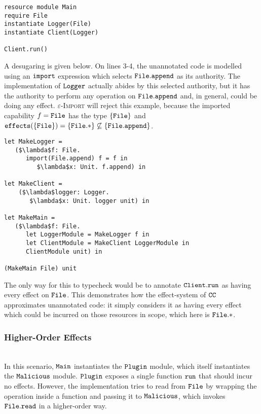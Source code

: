 \begin{lstlisting}
resource module Main
require File
instantiate Logger(File)
instantiate Client(Logger)

Client.run()
\end{lstlisting}

A desugaring is given below. On lines 3-4, the unannotated code is modelled using an $\mathtt{import}$ expression which selects $\mathtt{File.append}$ as its authority. The implementation of $\mathtt{Logger}$ actually abides by this selected authority, but it has the authority to perform any operation on $\mathtt{File.append}$ and, in general, could be doing any effect. \textsc{$\varepsilon$-Import} will reject this example, because the imported capability $f = \mathtt{File}$ has the type $\{ \mathtt{File} \}$ and $\mathtt{effects}(\{ \mathtt{File} \}) = \{ \mathtt{File}.* \} \not\subseteq \{ \mathtt{ File.append } \}$.

\begin{lstlisting}
let MakeLogger =
   ($\lambda$f: File.
      import(File.append) f = f in
         $\lambda$x: Unit. f.append) in

let MakeClient =
	($\lambda$logger: Logger.
	   $\lambda$x: Unit. logger unit) in

let MakeMain =
   ($\lambda$f: File.
      let LoggerModule = MakeLogger f in
      let ClientModule = MakeClient LoggerModule in
      ClientModule unit) in

(MakeMain File) unit
\end{lstlisting}

The only way for this to typecheck would be to annotate $\mathtt{Client.run}$ as having every effect on $\mathtt{File}$. This demonstrates how the effect-system of $\mathtt{CC}$ approximates unannotated code: it simply considers it as having every effect which could be incurred on those resources in scope, which here is $\mathtt{File}.*$.\\





\subsubsection{Higher-Order Effects}~\\

In this scenario, $\mathtt{Main}$ instantiates the $\mathtt{Plugin}$ module, which itself instantiates the $\mathtt{Malicious}$ module. $\mathtt{Plugin}$ exposes a single function $\mathtt{run}$ that should incur no effects. However, the implementation tries to read from $\mathtt{File}$ by wrapping the operation inside a function and passing it to $\mathtt{Malicious}$, which invokes $\mathtt{File.read}$ in a higher-order way.

